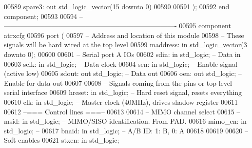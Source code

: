 \begin{DoxyCode}
00589         spare3: \textcolor{keywordflow}{out} \textcolor{comment}{std\_logic\_vector}(\textcolor{vhdllogic}{}\textcolor{vhdllogic}{15} \textcolor{keywordflow}{downto} \textcolor{vhdllogic}{}\textcolor{vhdllogic}{0})
00590 
00591     );
00592 \textcolor{keywordflow}{end} \textcolor{keywordflow}{component};
00593 
00594 \textcolor{keyword}{-- ----------------------------------------------------------------------------}
00595 \textcolor{keywordflow}{component} atrxcfg
00596     \textcolor{keywordflow}{port} (
00597 \textcolor{keyword}{        -- Address and location of this module}
00598 \textcolor{keyword}{        -- These signals will be hard wired at the top level}
00599         maddress: \textcolor{keywordflow}{in} \textcolor{comment}{std\_logic\_vector}(\textcolor{vhdllogic}{}\textcolor{vhdllogic}{3} \textcolor{keywordflow}{downto} \textcolor{vhdllogic}{}\textcolor{vhdllogic}{0});
00600     
00601 \textcolor{keyword}{        -- Serial port A IOs}
00602         sdin: \textcolor{keywordflow}{in} \textcolor{comment}{std\_logic};     \textcolor{keyword}{-- Data in}
00603         sclk: \textcolor{keywordflow}{in} \textcolor{comment}{std\_logic};     \textcolor{keyword}{-- Data clock}
00604         sen: \textcolor{keywordflow}{in} \textcolor{comment}{std\_logic};  \textcolor{keyword}{-- Enable signal (active low)}
00605         sdout: \textcolor{keywordflow}{out} \textcolor{comment}{std\_logic};   \textcolor{keyword}{-- Data out}
00606         oen: \textcolor{keywordflow}{out} \textcolor{comment}{std\_logic};         \textcolor{keyword}{-- Enable for data out}
00607     
00608 \textcolor{keyword}{        -- Signals coming from the pins or top level serial interface}
00609         hreset: \textcolor{keywordflow}{in} \textcolor{comment}{std\_logic};   \textcolor{keyword}{-- Hard reset signal, resets everything}
00610         clk: \textcolor{keywordflow}{in} \textcolor{comment}{std\_logic};  \textcolor{keyword}{-- Master clock (40MHz), drives shadow register}
00611         
00612 \textcolor{keyword}{        --=== Control lines ===--}
00613         
00614 \textcolor{keyword}{        -- MIMO channel select}
00615 \textcolor{keyword}{        --msid: in std\_logic;               -- MIMO/SISO identification. From PAD.}
00616         mimo\_en: \textcolor{keywordflow}{in} \textcolor{comment}{std\_logic};  \textcolor{keyword}{-- }
00617         bnaid: \textcolor{keywordflow}{in} \textcolor{comment}{std\_logic};        \textcolor{keyword}{-- A/B ID: 1: B, 0: A}
00618 
00619         
00620 \textcolor{keyword}{        -- Soft enables}
00621         stxen: \textcolor{keywordflow}{in} \textcolor{comment}{std\_logic};

\end{DoxyCode}
